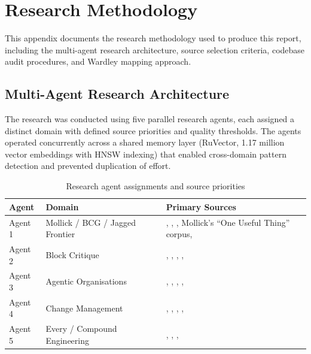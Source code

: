 \chapter{Research Methodology}
\label{ch:methodology}

This appendix documents the research methodology used to produce this report, including the multi-agent research architecture, source selection criteria, codebase audit procedures, and Wardley mapping approach.

\section{Multi-Agent Research Architecture}

The research was conducted using five parallel research agents, each assigned a distinct domain with defined source priorities and quality thresholds. The agents operated concurrently across a shared memory layer (RuVector, 1.17 million vector embeddings with HNSW indexing) that enabled cross-domain pattern detection and prevented duplication of effort.

\begin{table}[H]
\centering
\caption{Research agent assignments and source priorities}
\label{tab:research-agents}
\begin{tabularx}{\textwidth}{l l X}
\toprule
\textbf{Agent} & \textbf{Domain} & \textbf{Primary Sources} \\
\midrule
Agent 1 & Mollick / BCG / Jagged Frontier & \textcite{DellAcqua2026}, \textcite{Randazzo2024}, \textcite{DellAcqua2023}, Mollick's ``One Useful Thing'' corpus, \textcite{BCGAIKPIs2025} \\
\addlinespace
Agent 2 & Block Critique & \textcite{DorseyBotha2026}, \textcite{Zamost2026}, \textcite{Spicer2026}, \textcite{Klarna2025}, \textcite{OrgvueForrester2025} \\
\addlinespace
Agent 3 & Agentic Organisations & \textcite{McKinseyAgenticOrg2026}, \textcite{McKinseySixShifts2026}, \textcite{BCGAgenticShift2025}, \textcite{BCGAgenticEnterprise2025}, \textcite{Deloitte2026} \\
\addlinespace
Agent 4 & Change Management & \textcite{WadeBonnet2025}, \textcite{Teece2025}, \textcite{MicrosoftDirectedAutonomy2025}, \textcite{Prosci2024}, \textcite{Capgemini2025} \\
\addlinespace
Agent 5 & Every / Compound Engineering & \textcite{Shipper2026}, \textcite{Klaassen2025}, \textcite{CyberArk2025}, \textcite{TDS2026} \\
\bottomrule
\end{tabularx}
\end{table}

